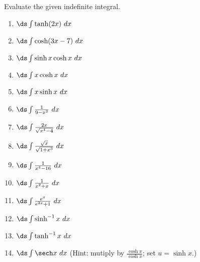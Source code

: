 \begin{enumialphparenastyle}
\begin{ex}
Evaluate the given indefinite integral.
\begin{enumerate}
\item {$\ds \int \tanh (2x)\ dx$}

\item {$\ds \int \cosh (3x-7)\ dx$}

\item {$\ds \int \sinh x\cosh x\ dx$}

\item {$\ds \int x\cosh x\ dx$}

\item {$\ds \int x\sinh x\ dx$}

\item {$\ds \int \frac{1}{9-x^2}\ dx$}

\item {$\ds \int \frac{2x}{\sqrt{x^4-4}}\ dx$}

\item {$\ds \int \frac{\sqrt{x}}{\sqrt{1+x^3}}\ dx$}

\item {$\ds \int \frac{1}{x^4-16}\ dx$}

\item {$\ds \int \frac{1}{x^2+x}\ dx$}

\item {$\ds \int \frac{e^x}{e^{2x}+1}\ dx$}

\item {$\ds \int \sinh^{-1}x \ dx$}

\item {$\ds \int \tanh^{-1}x \ dx$}

\item {$\ds \int \sech x \ dx$ \quad(Hint: mutiply by $\frac{\cosh x}{\cosh x}$; set $u = \sinh x$.)}


\end{enumerate}
\end{ex}
\end{enumialphparenastyle}

